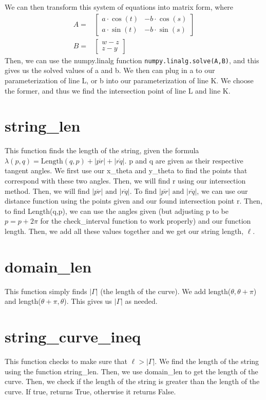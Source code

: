 \documentclass{article}
\begin{document}
We can then transform this system of equations into matrix form, where 
\begin{eqnarray*}
    A = & \begin{bmatrix}
        a\cdot \cos(t) & -b\cdot \cos(s)\\
        a\cdot \sin(t) & -b\cdot \sin(s)
        \end{bmatrix}	 \\
    B =  & \begin{bmatrix}
        w-z \\
        z-y
        \end{bmatrix}
\end{eqnarray*}
Then, we can use the numpy.linalg function \verb|numpy.linalg.solve(A,B)|, and this gives us the solved values of a and b. We then can plug in a to our parameterization of line L, or b into our parameterization of line K. We choose the former, and thus we find the intersection point of line L and line K.

\section*{string\_len}
This function finds the length of the string, given the formula $\lambda (p,q)= \text{Length}(q,p)+|\overline{pr}|+|\overline{rq}|$. p and q are given as their respective tangent angles. We first use our x\_theta and y\_theta to find the points that correspond with these two angles. Then, we will find r using our intersection method. Then, we will find $|\overline{pr}| \text{ and } |\overline{rq}|$. To find $|\overline{pr}| \text{ and } |\overline{rq}|$, we can use our distance function using the points given and our found intersection point r. Then, to find Length(q,p), we can use the angles given (but adjusting p to be $p=p+2\pi$ for the check\_interval function to work properly) and our function length. Then, we add all these values together and we get our string length, $\ell$.

\section*{domain\_len}
This function simply finds $|\Gamma|$ (the length of the curve). We add length($\theta, \theta+\pi$) and length($\theta+\pi, \theta$). This gives us $|\Gamma|$ as needed.

\newpage
\section*{string\_curve\_ineq}
This function checks to make sure that $\ell > |\Gamma|$. We find the length of the string using the function string\_len. Then, we use domain\_len to get the length of the curve. Then, we check if the length of the string is greater than the length of the curve. If true, returns True, otherwise it returns False.
\end{document}

